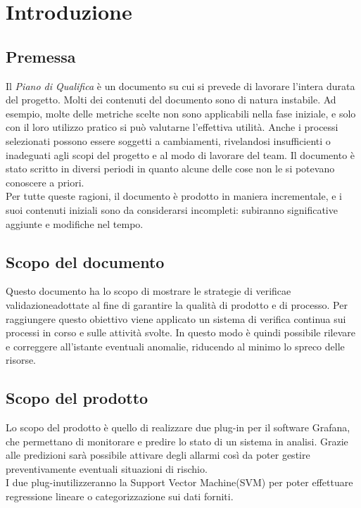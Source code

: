 \section{Introduzione}
\subsection{Premessa}
Il \textit{Piano di Qualifica} è un documento su cui si prevede di lavorare l'intera durata del progetto. Molti dei contenuti del documento sono di natura instabile. Ad esempio, molte delle metriche scelte non sono applicabili nella fase iniziale, e solo con il loro utilizzo pratico si può valutarne l'effettiva utilità. Anche i processi selezionati possono essere soggetti a cambiamenti, rivelandosi insufficienti o inadeguati agli scopi del progetto e al modo di lavorare del team. Il documento è stato scritto in diversi periodi in quanto alcune delle cose non le si potevano conoscere a priori. \\
Per tutte queste ragioni, il documento è prodotto in maniera incrementale, e i suoi contenuti iniziali sono da considerarsi incompleti: subiranno significative aggiunte e modifiche nel tempo.

\subsection{Scopo del documento}
Questo documento ha lo scopo di mostrare le strategie di verifica\glo e validazione\glo adottate al fine di garantire la qualità di prodotto e di processo. Per raggiungere questo obiettivo viene applicato un sistema di verifica continua sui processi in corso e sulle attività svolte. In questo modo è quindi possibile rilevare e correggere all'istante eventuali anomalie, riducendo al minimo lo spreco delle risorse.

\subsection{Scopo del prodotto}
Lo scopo del prodotto è quello di realizzare due plug-in per il software Grafana\glo, che permettano di monitorare e predire lo stato di un sistema in analisi. Grazie alle predizioni sarà possibile attivare degli allarmi così da poter gestire preventivamente eventuali situazioni di rischio. \\
I due plug-in\glo utilizzeranno la Support Vector Machine\glo (SVM) per poter effettuare regressione lineare o categorizzazione sui dati forniti.
\begin{comment}
I due plug-in\glo utilizzeranno la Support Vector Machine\glo (SVM) o la Regressione Lineare per classificazione o regressione sui dati forniti.
\end{comment}

